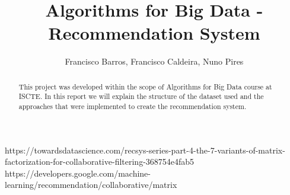 \documentclass{article}
\title{Algorithms for Big Data - Recommendation System}
\author{Francisco Barros, Francisco Caldeira, Nuno Pires}
\begin{document}
\maketitle

\begin{abstract}
    This project was developed within the scope of Algorithms for Big Data course at ISCTE. 
    In this report we will explain the structure of the dataset used and the approaches that were implemented to create the recommendation system.
\end{abstract}











https://towardsdatascience.com/recsys-series-part-4-the-7-variants-of-matrix-factorization-for-collaborative-filtering-368754e4fab5
https://developers.google.com/machine-learning/recommendation/collaborative/matrix
\end{document}
